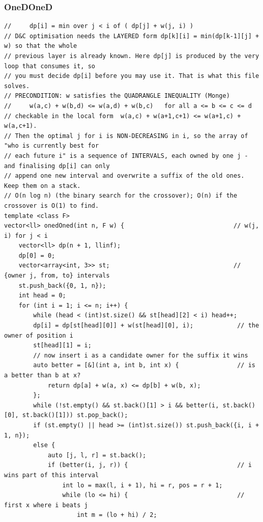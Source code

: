 \documentclass[9pt,a4paper,twocolumn]{extarticle}
\begin{document}
\subsubsection{OneDOneD}
\nopagebreak
\begin{lstlisting}
//     dp[i] = min over j < i of ( dp[j] + w(j, i) )
// D&C optimisation needs the LAYERED form dp[k][i] = min(dp[k-1][j] + w) so that the whole
// previous layer is already known. Here dp[j] is produced by the very loop that consumes it, so
// you must decide dp[i] before you may use it. That is what this file solves.
// PRECONDITION: w satisfies the QUADRANGLE INEQUALITY (Monge)
//     w(a,c) + w(b,d) <= w(a,d) + w(b,c)   for all a <= b <= c <= d
// checkable in the local form  w(a,c) + w(a+1,c+1) <= w(a+1,c) + w(a,c+1).
// Then the optimal j for i is NON-DECREASING in i, so the array of "who is currently best for
// each future i" is a sequence of INTERVALS, each owned by one j - and finalising dp[i] can only
// append one new interval and overwrite a suffix of the old ones. Keep them on a stack.
// O(n log n) (the binary search for the crossover); O(n) if the crossover is O(1) to find.
template <class F>
vector<ll> onedOned(int n, F w) {                              // w(j, i) for j < i
    vector<ll> dp(n + 1, llinf);
    dp[0] = 0;
    vector<array<int, 3>> st;                                  // {owner j, from, to} intervals
    st.push_back({0, 1, n});
    int head = 0;
    for (int i = 1; i <= n; i++) {
        while (head < (int)st.size() && st[head][2] < i) head++;
        dp[i] = dp[st[head][0]] + w(st[head][0], i);            // the owner of position i
        st[head][1] = i;
        // now insert i as a candidate owner for the suffix it wins
        auto better = [&](int a, int b, int x) {                // is a better than b at x?
            return dp[a] + w(a, x) <= dp[b] + w(b, x);
        };
        while (!st.empty() && st.back()[1] > i && better(i, st.back()[0], st.back()[1])) st.pop_back();
        if (st.empty() || head >= (int)st.size()) st.push_back({i, i + 1, n});
        else {
            auto [j, l, r] = st.back();
            if (better(i, j, r)) {                              // i wins part of this interval
                int lo = max(l, i + 1), hi = r, pos = r + 1;
                while (lo <= hi) {                              // first x where i beats j
                    int m = (lo + hi) / 2;

\end{lstlisting}
\end{document}
